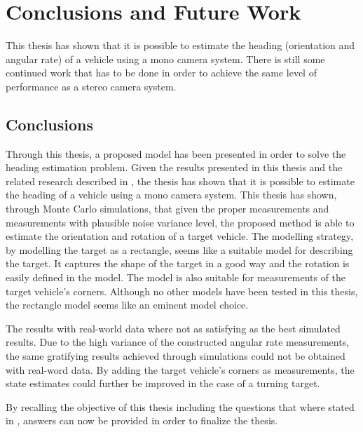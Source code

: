 \chapter{Conclusions and Future Work}
\label{cha:conclusions}

This thesis has shown that it is possible to estimate the heading (orientation and angular rate) of a vehicle using a mono camera system.
There is still some continued work that has to be done in order to achieve the same level of performance as a stereo camera system.

\section{Conclusions}
Through this thesis, a proposed model has been presented in order to solve the heading estimation problem.
Given the results presented in this thesis and the related research described in , the thesis has shown that it is possible to estimate the heading of a vehicle using a mono camera system.
This thesis has shown, through Monte Carlo simulations, that given the proper measurements and measurements with plausible noise variance level, the proposed method is able to estimate the orientation and rotation of a target vehicle.
The modelling strategy, by modelling the target as a rectangle, seems like a suitable model for describing the target.
It captures the shape of the target in a good way and the rotation is easily defined in the model.
The model is also suitable for measurements of the target vehicle's corners.
Although no other models have been tested in this thesis, the rectangle model seems like an eminent model choice.

The results with real-world data where not as satisfying as the best simulated results.
Due to the high variance of the constructed angular rate measurements, the same gratifying results achieved through simulations could not be obtained with real-word data.
By adding the target vehicle's corners as measurements, the state estimates could further be improved in the case of a turning target.

\newpage

By recalling the objective of this thesis including the questions that where stated in , answers can now be provided in order to finalize the thesis.

